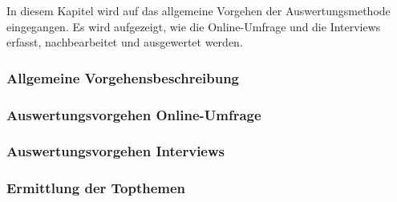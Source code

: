 \documentclass[../../main.tex]{subfiles}
\begin{document}
\begin{sloppypar}
In diesem Kapitel wird auf das allgemeine Vorgehen der Auswertungsmethode eingegangen. Es wird aufgezeigt, wie die Online-Umfrage und die Interviews erfasst, nachbearbeitet und ausgewertet werden.

\end{sloppypar}

\subsubsection{Allgemeine Vorgehensbeschreibung}
\label{allgemeine_vorgehensbeschreibung}



\subsubsection{Auswertungsvorgehen Online-Umfrage}
\label{auswertung_online}



\newpage
\subsubsection{Auswertungsvorgehen Interviews}
\label{auswertung_interview}



\subsubsection{Ermittlung der Topthemen}
\label{ermittlung_topthemen}

\end{document}
